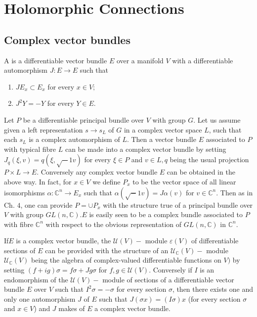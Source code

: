 \chapter{Holomorphic Connections}\label{chap6}%

\section{Complex vector bundles}\label{chap6:sec1}%

\setcounter{defn}{0}
\begin{defn}\label{chap6:sec1:def1}%
  A is a differentiable vector bundle $E$
  over a manifold $V$ with a differentiable automorphism $J : E \to E$
  such that 
  \begin{enumerate}[1)]
  \item $JE_x \subset E_x$ for every $x \in V;$
  \item $J^2 Y = - Y$ for every $Y \in E$.
  \end{enumerate}
\end{defn}

Let $P$ be a differentiable principal bundle over $V$ with group
$G$. Let us assume given a left representation $s \to s_L$ of $G$ in a
complex vector space $L$, such that each $s_L$ is a complex
automorphism of $L$. Then a vector bundle $E$ associated to $P$ with
typical fibre $L$ can be made into a complex vector bundle by setting
$J_q (\xi, v) = q (\xi, \sqrt - 1 v)$ for every $\xi \in P$ and
$v \in L, q$ being the usual projection $P \times L \to E$.
Conversely any complex vector bundle $E$ can be obtained in the above
way. In fact, for $x \in V$ we define $P_x$ to be the vector space of
all linear isomorphisms $\alpha : \mathbb{C}^n \to E_x$ such that
$\alpha (\sqrt - 1 v) = J \alpha (v)$ for $v \in \mathbb{C}^n$. Then as
in Ch. $4$, one can provide $P = \cup P_x$ with the structure true of
a principal bundle over $V$ with group $GL (n, \mathbb{C}). E$ is
easily seen to be a complex bundle associated to $P$ with fibre
$\mathbb{C}^n$ with respect to the obvious representation of $GL (n,
\mathbb{C})$ in $\mathbb{C}^n$. 

If\pageoriginale $E$ is a complex vector bundle, the $\mathscr{U}(V)-$ module
$\varepsilon (V)$ of differentiable sections of $E$ can be provided
with the structure of an $\mathscr{U}_\mathbb{C} (V)-$ module
$\mathscr{U}_\mathbb{C} (V)$ being the algebra of complex-valued
differentiable functions on $V)$ by setting $(f + ig) \sigma = f
\sigma  + J g \sigma$ for $f, g \in \mathscr{U}(V)$. Conversely if $I$
is an endomorphism of the $\mathscr{U}(V)-$ module of sections of a
differentiable vector bundle $E$ over $V$ such that $I^2 \sigma = -
\sigma$ for every section $\sigma$, then there exists one and  only
one automorphism $J$ of $E$ such that $J (\sigma x) = (I \sigma)x$
(for every section $\sigma$ and $x \in V$) and $J$ makes of $E$ a
complex vector bundle. 

